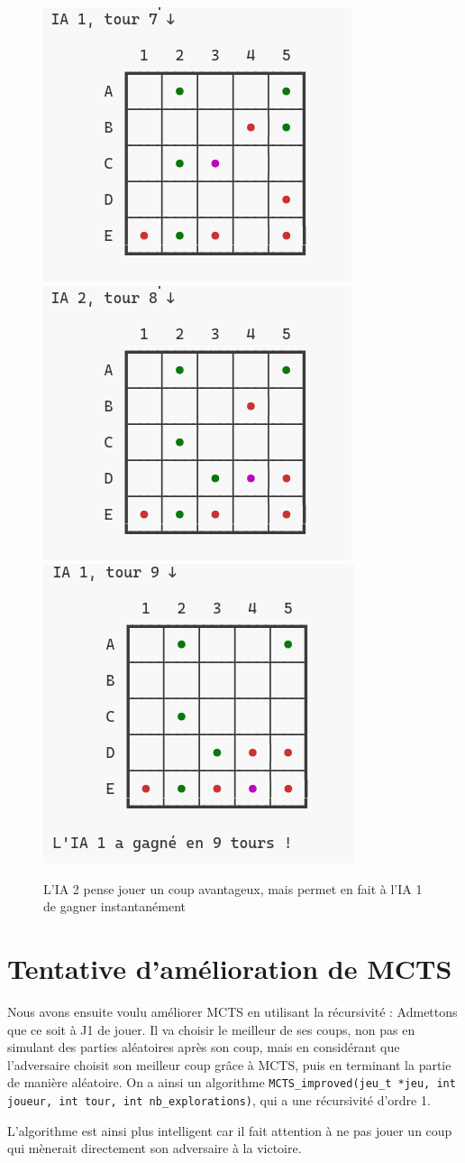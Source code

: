 \documentclass{article}
\begin{document}
\begin{figure}[H]
    \centering
    \includegraphics[width=0.3\linewidth]{ia v1 -2.png}
    \includegraphics[width=0.3\linewidth]{ia v1 -1.png}
    \includegraphics[width=0.3\linewidth]{ia v1.png}
    \caption{L'IA 2 pense jouer un coup avantageux, mais permet en fait à l'IA 1 de gagner instantanément}
    \label{fig:2}
\end{figure}




\section{Tentative d'amélioration de MCTS}

Nous avons ensuite voulu améliorer MCTS en utilisant la récursivité : Admettons que ce soit à J1 de jouer. Il va choisir le meilleur de ses coups, non pas en simulant des parties aléatoires après son coup, mais en considérant que l'adversaire choisit son meilleur coup grâce à MCTS, puis en terminant la partie de manière aléatoire. On a ainsi un algorithme {\tt MCTS\_improved(jeu\_t *jeu, int joueur, int tour, int nb\_explorations)}, qui a une récursivité d'ordre 1.

L'algorithme est ainsi plus intelligent car il fait attention à ne pas jouer un coup qui mènerait directement son adversaire à la victoire.
\end{document}

